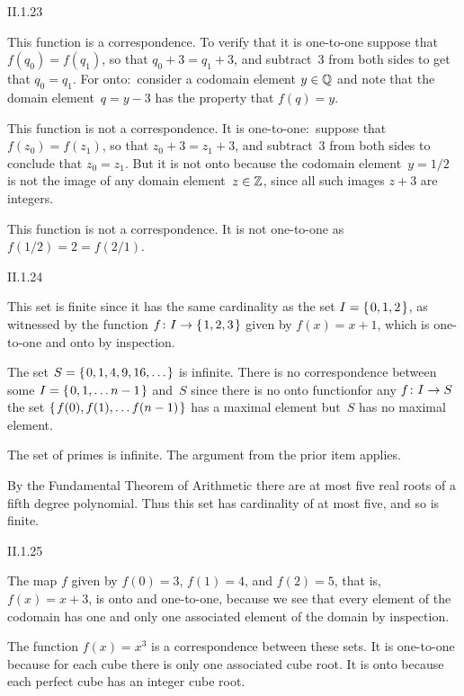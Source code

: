 \begin{ans}{II.1.23}
\begin{exparts}
\item This function is a correspondence.
  To verify that it is one-to-one suppose that $f(q_0)=f(q_1)$,
  so that $q_0+3=q_1+3$, and subtract~$3$ from both sides to get
  that $q_0=q_1$.
  For onto:~consider a codomain element $y\in\mathbb{Q}$ and note that
  the domain element~$q=y-3$ has the property that $f(q)=y$.
\item This function is not a correspondence.
  It is one-to-one:~suppose that $f(z_0)=f(z_1)$,
  so that $z_0+3=z_1+3$, and subtract~$3$ from both sides to conclude
  that $z_0=z_1$.
  But it is not onto because the codomain element~$y=1/2$
  is not the image of any
  domain element~$z\in\mathbb{Z}$, since all such images $z+3$ are integers.
\item This function is not a correspondence.
  It is not one-to-one as $f(1/2)=2=f(2/1)$.
\end{exparts}
\end{ans}
%
\begin{ans}{II.1.24}
\begin{exparts}
\item This set is finite since it has the same cardinality as the set
  $I=\set{0,1,2}$, as witnessed by the function $\map{f}{I}{\set{1,2,3}}$
  given by $f(x)=x+1$, which is one-to-one and onto by inspection.
\item The set $S=\set{0,1,4,9,16,\ldots}$ is infinite.
  There is no correspondence between some
  $I=\set{0,1,\ldots n-1}$ and~$S$ since there is no onto function\Dash for
  any $\mbox{$f\colon I\to S$}$ the set $\set{f(0),f(1),\ldots f(n-1)}$ has a
  maximal element but~$S$ has no maximal element.
\item The set of primes is infinite.
  The argument from the prior item applies.
\item By the Fundamental Theorem of Arithmetic there are at most five
  real roots of a fifth degree polynomial.
  Thus this set has cardinality of at most five, and so is finite.
\end{exparts}
\end{ans}
%
\begin{ans}{II.1.25}
\begin{exparts}
\item The map $f$ given by $f(0)=3$, $f(1)=4$, and $f(2)=5$,
  that is, $f(x)=x+3$, is onto and one-to-one, because
  we see that every element of the codomain has one and only one
  associated element of the domain by inspection.
\item The function $f(x)=x^3$ is a correspondence between these sets.
  It is one-to-one because for each cube there is only one associated
  cube root.
  It is onto because each perfect cube has an integer cube root.
\end{exparts}
\end{ans}
